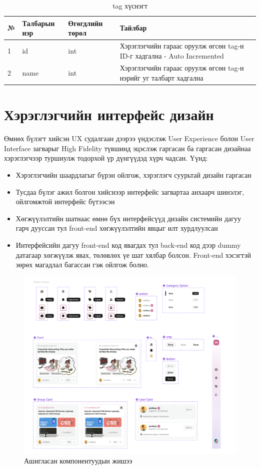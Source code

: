 \begin{table}[h]
	\caption{tag хүснэгт}
	\begin{tabular}{|l|l|l|p{8cm}|}
	\hline
	№ &  Талбарын нэр & Өгөгдлийн төрөл & Тайлбар \\ \hline
	1 &  id & int & Хэрэглэгчийн гараас оруулж өгсөн tag-н ID-г хадгална - Auto Incremented \\ \hline
	2 &  name & int & Хэрэглэгчийн гараас оруулж өгсөн tag-н нэрийг уг талбарт хадгална \\ \hline

\end{tabular}
\end{table}


\clearpage
\section{Хэрэглэгчийн интерфейс дизайн}

Өмнөх бүлэгт хийсэн UX судалгаан дээрээ үндэслэж User Experience болон User Interface загварыг High Fidelity түвшинд эцэслэж гаргасан ба гаргасан дизайнаа хэрэглэгчээр туршиулж тодорхой үр дүнгүүдэд хүрч чадсан. Үүнд: 

\begin{itemize}
	\item Хэрэглэгчийн шаардлагыг бүрэн ойлгож, хэрэглэгч суурьтай дизайн гаргасан
	\item Тусдаа бүлэг ажил болгон хийснээр интерфейс загвартаа анхаарч шинэлэг, ойлгомжтой интерфейс бүтээсэн
	\item Хөгжүүлэлтийн шатнаас өмнө бүх интерфейсүүд дизайн системийн дагуу гарч дууссан тул front-end хөгжүүлэлтийн явцыг илт хурдлуулсан
	\item Интерфейсийн дагуу front-end код явагдах тул back-end код дээр dummy датагаар хөгжүүлж явах, төлөвлөх үе шат хялбар болсон. Front-end хэсэгтэй зөрөх магадлал багассан гэж ойлгож болно.
\end{itemize}

\begin{figure}[h]
	\centering
	\includegraphics[width=15cm]{images/interfaces/components.png}
	\caption{Ашигласан компонентуудын жишээ}
	\label{fig:component}
\end{figure}

